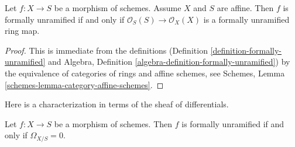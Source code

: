 \begin{lemma}
\label{lemma-affine-formally-unramified}
Let $f : X \to S$ be a morphism of schemes.
Assume $X$ and $S$ are affine.
Then $f$ is formally unramified if and only if
$\mathcal{O}_S(S) \to \mathcal{O}_X(X)$ is a formally unramified
ring map.
\end{lemma}

\begin{proof}
This is immediate from the definitions
(Definition \ref{definition-formally-unramified} and
Algebra, Definition \ref{algebra-definition-formally-unramified})
by the equivalence of categories of rings and affine schemes,
see
Schemes, Lemma \ref{schemes-lemma-category-affine-schemes}.
\end{proof}

\noindent
Here is a characterization in terms of the sheaf of differentials.

\begin{lemma}
\label{lemma-formally-unramified-differentials}
Let $f : X \to S$ be a morphism of schemes.
Then $f$ is formally unramified if and only if $\Omega_{X/S} = 0$.
\end{lemma}

